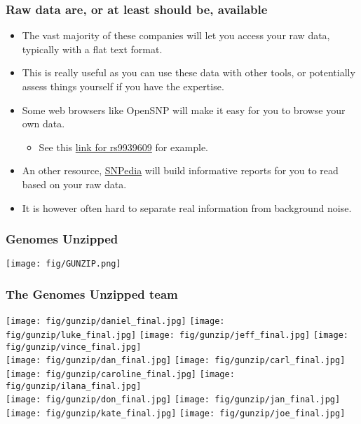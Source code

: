 \documentclass{beamer}
\begin{document}
\begin{frame}
  \frametitle{Raw data are, or at least should be, available}
  \begin{itemize}
  \item The vast majority of these companies will let you access your raw data, typically with a flat text format.
  \item This is really useful as you can use these data with other tools, or potentially assess things yourself if you have the expertise.
  \item Some web browsers like OpenSNP will make it easy for you to browse your own data.
    \begin{itemize}
    \item See this \href{https://opensnp.org/snps/rs9939609}{link for rs9939609} for example.
    \end{itemize}
  \item An other resource, \href{http://www.snpedia.com/index.php/Promethease}{SNPedia} will build informative reports for you to read based on your raw data.
  \item It is however often hard to separate real information from background noise.
  \end{itemize}
\end{frame}


\begin{frame}
\frametitle{Genomes Unzipped}
  \begin{center}
    \texttt{[image: fig/GUNZIP.png]}
  \end{center}
\end{frame}



\begin{frame}
\frametitle{The Genomes Unzipped team}
  \begin{center}
    \texttt{[image: fig/gunzip/daniel\_final.jpg]}
    \texttt{[image: fig/gunzip/luke\_final.jpg]}
    \texttt{[image: fig/gunzip/jeff\_final.jpg]}
    \texttt{[image: fig/gunzip/vince\_final.jpg]}\\
    \texttt{[image: fig/gunzip/dan\_final.jpg]}
    \texttt{[image: fig/gunzip/carl\_final.jpg]}
    \texttt{[image: fig/gunzip/caroline\_final.jpg]}
    \texttt{[image: fig/gunzip/ilana\_final.jpg]}\\
    \texttt{[image: fig/gunzip/don\_final.jpg]}
    \texttt{[image: fig/gunzip/jan\_final.jpg]}
    \texttt{[image: fig/gunzip/kate\_final.jpg]}
    \texttt{[image: fig/gunzip/joe\_final.jpg]}
  \end{center}
\end{frame}
\end{document}
